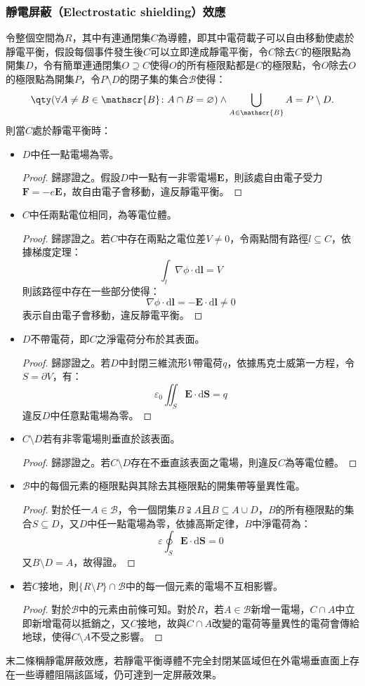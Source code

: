 \documentclass[a4paper,12pt]{report}
\begin{document}
\begin{itemize}
\subsubsection{靜電屏蔽（Electrostatic shielding）效應}
令整個空間為$R$，其中有連通閉集$C$為導體，即其中電荷載子可以自由移動使處於靜電平衡，假設每個事件發生後$C$可以立即達成靜電平衡，令$C$除去$C$的極限點為開集$D$，令有簡單連通閉集$O\supseteq C$使得$O$的所有極限點都是$C$的極限點，令$O$除去$O$的極限點為開集$P$，令$P\setminus D$的閉子集的集合$\mathscr{B}$使得：
\[\qty(\forall A\neq B\in\mathscr{B}\colon A\cap B=\varnothing)\land\bigcup_{A\in\mathscr{B}}A=P\setminus D.\]
則當$C$處於靜電平衡時：
\begin{itemize}
\item $D$中任一點電場為零。
\begin{proof}
歸謬證之。假設$D$中一點有一非零電場$\mathbf{E}$，則該處自由電子受力$\mathbf{F}=-e\mathbf{E}$，故自由電子會移動，違反靜電平衡。
\end{proof}
\item $C$中任兩點電位相同，為等電位體。
\begin{proof}
歸謬證之。若$C$中存在兩點之電位差$V\neq 0$，令兩點間有路徑$l\subseteq C$，依據梯度定理：
\[\int_{l}\nabla\phi\cdot\mathrm{d}\mathbf{l}=V\]
則該路徑中存在一些部分使得：
\[\nabla\phi\cdot\mathrm{d}\mathbf{l}=-\mathbf{E}\cdot\mathrm{d}\mathbf{l}\neq 0\]
表示自由電子會移動，違反靜電平衡。
\end{proof}
\item $D$不帶電荷，即$C$之淨電荷分布於其表面。
\begin{proof}
歸謬證之。若$D$中封閉三維流形$V$帶電荷$q$，依據馬克士威第一方程，令$S=\partial V$，有：
\[\varepsilon_0\iint_{S}\mathbf {E} \cdot \mathrm{d}\mathbf{S}=q\]
違反$D$中任意點電場為零。
\end{proof}
\item $C\setminus D$若有非零電場則垂直於該表面。
\begin{proof}
歸謬證之。若$C\setminus D$存在不垂直該表面之電場，則違反$C$為等電位體。
\end{proof}
\item $\mathscr{B}$中的每個元素的極限點與其除去其極限點的開集帶等量異性電。
\begin{proof}
對於任一$A\in\mathscr{B}$，令一個閉集$B\supsetneqq A$且$B\subseteq A\cup D$，$B$的所有極限點的集合$S\subseteq D$，又$D$中任一點電場為零，依據高斯定律，$B$中淨電荷為：
\[\varepsilon\oint_S\mathbf{E}\cdot\mathrm{d}\mathbf{S}=0\]
又$B\setminus D=A$，故得證。
\end{proof}
\item 若$C$接地，則$\{R\setminus P\}\cap\mathscr{B}$中的每一個元素的電場不互相影響。
\begin{proof}
對於$\mathscr{B}$中的元素由前條可知。對於$R$，若$A\in\mathscr{B}$新增一電場，$C\cap A$中立即新增電荷以抵銷之，又$C$接地，故與$C\cap A$改變的電荷等量異性的電荷會傳給地球，使得$C\setminus A$不受之影響。
\end{proof}
\end{itemize}
末二條稱靜電屏蔽效應，若靜電平衡導體不完全封閉某區域但在外電場垂直面上存在一些導體阻隔該區域，仍可達到一定屏蔽效果。

\end{itemize}
\end{document}
